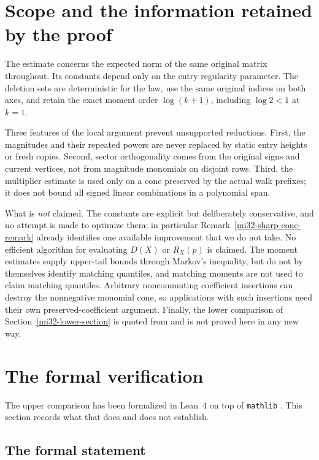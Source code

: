 \documentclass[11pt]{article}
\theoremstyle{definition}
\theoremstyle{remark}
\begin{document}
\section{Scope and the information retained by the proof}
\label{mi32-scope}

The estimate concerns the expected norm of the same original matrix
throughout. Its constants depend only on the entry regularity parameter.
The deletion sets are deterministic for the law, use the same original
indices on both axes, and retain the exact moment order $\log(k+1)$,
including $\log2<1$ at $k=1$.

Three features of the local argument prevent unsupported reductions.
First, the magnitudes and their repeated powers are never replaced by
static entry heights or fresh copies. Second, sector orthogonality
comes from the original signs and current vertices, not from magnitude
monomials on disjoint rows. Third, the multiplier estimate is used only
on a cone preserved by the actual walk prefixes; it does not bound all
signed linear combinations in a polynomial span.

What is \emph{not} claimed. The constants are explicit but
deliberately conservative, and no attempt is made to optimize them; in
particular Remark~\ref{mi32-sharp-cone-remark} already identifies one
available improvement that we do not take. No efficient algorithm for
evaluating $D(X)$ or $R_X(p)$ is claimed. The moment estimates supply
upper-tail bounds through Markov's inequality, but do not by themselves
identify matching quantiles, and matching moments are not used to claim
matching quantiles. Arbitrary noncommuting coefficient insertions can
destroy the nonnegative monomial cone, so applications with such
insertions need their own preserved-coefficient argument. Finally, the
lower comparison of Section~\ref{mi32-lower-section} is quoted from
\cite{LatalaSwiatkowski} and is not proved here in any new way.

\section{The formal verification}
\label{mi32-formalization}

The upper comparison has been formalized in Lean~4
\cite{LeanFour} on top of \texttt{mathlib} \cite{Mathlib}. This section
records what that does and does not establish.

\subsection{The formal statement}
\end{document}
